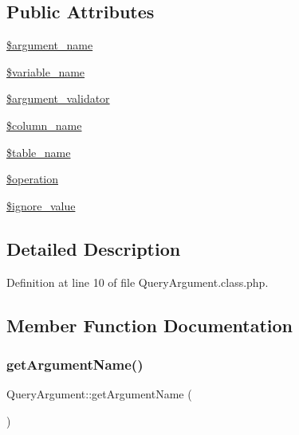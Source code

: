 \subsection*{Public Attributes}
\begin{DoxyCompactItemize}
\item 
\hyperlink{classQueryArgument_a90dcd71abf0c257d8cde2ac08de1cc4a}{\$argument\+\_\+name}
\item 
\hyperlink{classQueryArgument_a5f944bd99adb53d05a61aba70ff79d20}{\$variable\+\_\+name}
\item 
\hyperlink{classQueryArgument_a0af5784d1cea24a72fbb59b1fd1905c7}{\$argument\+\_\+validator}
\item 
\hyperlink{classQueryArgument_a6574925c4191d63ad3446ea7a9d38020}{\$column\+\_\+name}
\item 
\hyperlink{classQueryArgument_aba0fc1aa9d394626c35a4dd6b23452a1}{\$table\+\_\+name}
\item 
\hyperlink{classQueryArgument_a31f8bb196f9755a568a4fc69c4be08e3}{\$operation}
\item 
\hyperlink{classQueryArgument_a2833a265532882ef5cb5386894ef503e}{\$ignore\+\_\+value}
\end{DoxyCompactItemize}


\subsection{Detailed Description}


Definition at line 10 of file Query\+Argument.\+class.\+php.



\subsection{Member Function Documentation}
\hypertarget{classQueryArgument_a01a5627882c4034551e0c22daed811bd}{}\label{classQueryArgument_a01a5627882c4034551e0c22daed811bd} 
\subsubsection{\texorpdfstring{get\+Argument\+Name()}{getArgumentName()}}
{\footnotesize\ttfamily Query\+Argument\+::get\+Argument\+Name (\begin{DoxyParamCaption}{ }\end{DoxyParamCaption})}



